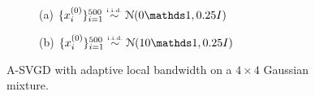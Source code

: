 \captionsetup[subfigure]{labelformat=empty}
\begin{figure}[t!]
    \centering 
\begin{subfigure}[b]{.48\textwidth} 
    \caption{(a) $\{x_i^{(0)}\}_{i = 1}^{500} \distiid \distNorm(0\ind, 0.25I)$  \label{fig:bwlocal}}
\end{subfigure}
\hfill
\centering
\begin{subfigure}[b]{0.48\textwidth}
    \caption{(b) $\{x_i^{(0)}\}_{i = 1}^{500} \distiid \distNorm(10\ind, 0.25I)$ \label{fig:slicelocal}}
\end{subfigure}

\caption{A-SVGD with adaptive local bandwidth on a $4 \times 4$ Gaussian mixture.}
\label{fig:gridlocal}
\end{figure}



